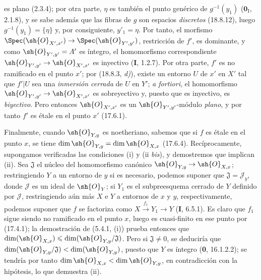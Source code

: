 
es plano (2.3.4); por otra parte, $\eta$ es también el punto genérico de $g^{-1}(y_1)$ ($\mathbf 0_{\mathrm I}$, 2.1.8), y se sabe además que las fibras de $g$ son espacios \emph{discretos} (18.8.12), luego $g^{-1}(y_1)=\{\eta\}$ y, por consiguiente, $y'_1=\eta$. Por tanto, el morfismo $\Spec(\sh{O}_{X',x'})\to\Spec(\sh{O}_{Y',y'})$, restricción de $f'$, es dominante, y como $\sh{O}_{Y',y'}=A'$ es íntegro, el homomorfismo correspondiente $\sh{O}_{Y',y'}\to\sh{O}_{X',x'}$ es inyectivo (\textbf I, 1.2.7). Por otra parte, $f'$ es no ramificado en el punto $x'$; por (18.8.3, \emph{d)}), existe un entorno $U$ de $x'$ en $X'$ tal que $f'|U$ sea una \emph{inmersión cerrada} de $U$ en $Y'$; \emph{a fortiori}, el homomorfismo $\sh{O}_{Y',y'}\to\sh{O}_{X',x'}$ es sobreyectivo y, puesto que es inyectivo, es \emph{biyectivo}. Pero entonces $\sh{O}_{X',x'}$ es un $\sh{O}_{Y',y'}$-módulo \emph{plano}, y por tanto $f'$ es étale en el punto $x'$ (17.6.1).

Finalmente, cuando $\sh{O}_{Y,y}$ es noetheriano, sabemos que si $f$ es étale en el punto $x$, se tiene $\dim\sh{O}_{Y,y}=\dim\sh{O}_{X,x}$ (17.6.4). Recíprocamente, supongamos verificadas las condiciones (i) y (ii \emph{bis}), y demostremos que implican (ii). Sea $\mathfrak J$ el núcleo del homomorfismo canónico $\sh{O}_{Y,y}\to\sh{O}_{X,x}$; restringiendo $Y$ a un entorno de $y$ si es necesario, podemos suponer que $\mathfrak J=\mathscr{J}_y$, donde $\mathscr{J}$ es un ideal de $\sh{O}_Y$; si $Y_1$ es el subpreesquema cerrado de $Y$ definido por $\mathscr{J}$, restringiendo aún más $X$ e $Y$ a entornos de $x$ y $y$, respectivamente, podemos suponer que $f$ se factoriza como $X\xrightarrow{f_1}Y_1\to Y$ (\textbf I, 6.5.1). Es claro que $f_1$ sigue siendo no ramificado en el punto $x$, luego es cuasi-finito en ese punto por (17.4.1); la demostración de (5.4.1, (i)) prueba entonces que $\dim(\sh{O}_{X,x})\leq\dim(\sh{O}_{Y,y}/\mathfrak J)$. Pero si $\mathfrak J\neq0$, se deduciría que $\dim(\sh{O}_{Y,y}/\mathfrak J)<\dim(\sh{O}_{Y,y})$, puesto que $Y$ es íntegro (\textbf 0, 16.1.2.2); se tendría por tanto $\dim\sh{O}_{X,x}<\dim\sh{O}_{Y,y}$, en contradicción con la hipótesis, lo que demuestra (ii).

